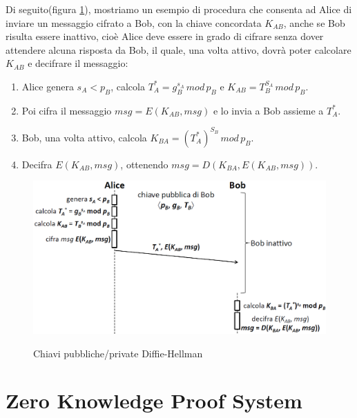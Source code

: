 Di seguito(figura \ref{fig:authex}), mostriamo un esempio di procedura che consenta ad Alice di inviare un messaggio cifrato a Bob, con la chiave concordata $K_{AB}$, anche se Bob risulta essere inattivo, cioè Alice deve essere in grado di cifrare senza dover attendere alcuna risposta da Bob, il quale, una volta attivo, dovrà poter calcolare $K_{AB}$ e decifrare il messaggio:
\begin{enumerate}
\item Alice genera $s_{A}<p_{B}$, calcola $T_{A}^{*}=g_{B}^{s_{A}} \, mod \, p_{B}$ e $K_{AB}=T_{B}^{S_{A}} \, mod \, p_{B}$.
\item Poi cifra il messaggio $msg=E(K_{AB},msg)$ e lo invia a Bob assieme a $T_{A}^{*}$.
\item Bob, una volta attivo, calcola  $K_{BA}=(T_{A}^*)^{S_{B}} \, mod \, p_{B}$.
\item Decifra $E(K_{AB},msg)$, ottenendo $msg=D(K_{BA},E(K_{AB},msg))$.
\end{enumerate}
\begin{figure}[htbp]
	\centering%
	\subfigure%
	{\includegraphics[scale=0.6, keepaspectratio]{Immagini/Capitolo6/DiffieHellman_pubseckey.png}}
	\caption{Chiavi pubbliche/private Diffie-Hellman}
	\label{fig:authex}
\end{figure} 

\section{Zero Knowledge Proof System}

